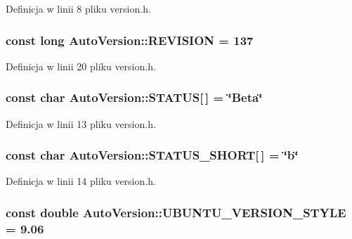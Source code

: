 Definicja w linii 8 pliku version.h.\hypertarget{a00019_e2d1fcdc67a4319c421677ebe1ef4d09}{
\subsubsection[{REVISION}]{\setlength{\rightskip}{0pt plus 5cm}const long {\bf AutoVersion::REVISION} = 137}}
\label{dd/da2/a00019_e2d1fcdc67a4319c421677ebe1ef4d09}




Definicja w linii 20 pliku version.h.\hypertarget{a00019_cb58e6df1058868fe3e780122ab30ef1}{
\subsubsection[{STATUS}]{\setlength{\rightskip}{0pt plus 5cm}const char {\bf AutoVersion::STATUS}\mbox{[}$\,$\mbox{]} = \char`\"{}Beta\char`\"{}}}
\label{dd/da2/a00019_cb58e6df1058868fe3e780122ab30ef1}




Definicja w linii 13 pliku version.h.\hypertarget{a00019_dc0aeb82b23e4fa3a91bc1f4d2ab0aed}{
\subsubsection[{STATUS\_\-SHORT}]{\setlength{\rightskip}{0pt plus 5cm}const char {\bf AutoVersion::STATUS\_\-SHORT}\mbox{[}$\,$\mbox{]} = \char`\"{}b\char`\"{}}}
\label{dd/da2/a00019_dc0aeb82b23e4fa3a91bc1f4d2ab0aed}




Definicja w linii 14 pliku version.h.\hypertarget{a00019_06157f622b974a3180a91ffa5e4fc200}{
\subsubsection[{UBUNTU\_\-VERSION\_\-STYLE}]{\setlength{\rightskip}{0pt plus 5cm}const double {\bf AutoVersion::UBUNTU\_\-VERSION\_\-STYLE} = 9.06}}
\label{dd/da2/a00019_06157f622b974a3180a91ffa5e4fc200}




